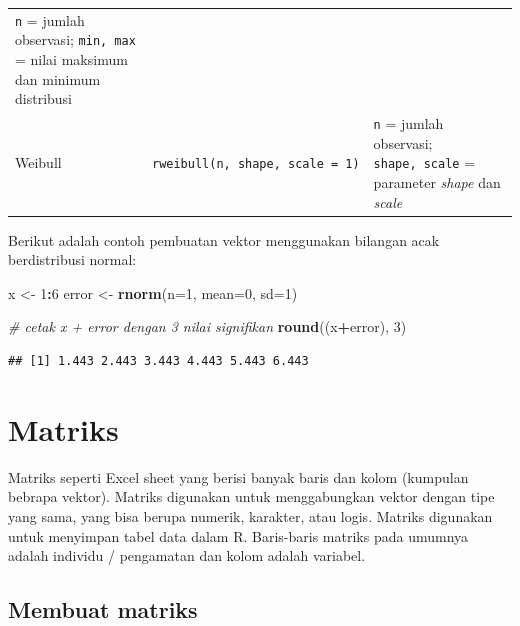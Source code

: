 \documentclass[]{book}
\newenvironment{Shaded}{\begin{snugshade}}{\end{snugshade}}
\newcommand{\CommentTok}[1]{\textcolor[rgb]{0.56,0.35,0.01}{\textit{#1}}}
\newcommand{\DataTypeTok}[1]{\textcolor[rgb]{0.13,0.29,0.53}{#1}}
\newcommand{\DecValTok}[1]{\textcolor[rgb]{0.00,0.00,0.81}{#1}}
\newcommand{\KeywordTok}[1]{\textcolor[rgb]{0.13,0.29,0.53}{\textbf{#1}}}
\newcommand{\NormalTok}[1]{#1}
\newcommand{\OperatorTok}[1]{\textcolor[rgb]{0.81,0.36,0.00}{\textbf{#1}}}
\newcommand{\StringTok}[1]{\textcolor[rgb]{0.31,0.60,0.02}{#1}}
\theoremstyle{definition}
\theoremstyle{definition}
\theoremstyle{definition}
\theoremstyle{remark}
\begin{document}
\begin{longtable}[]{@{}lll@{}}
\begin{minipage}[t]{0.65\columnwidth}
\texttt{n} = jumlah observasi; \texttt{min,\ max} = nilai maksimum dan minimum distribusi\strut
\end{minipage}\tabularnewline
\begin{minipage}[t]{0.07\columnwidth}\raggedright
Weibull\strut
\end{minipage} & \begin{minipage}[t]{0.19\columnwidth}\raggedright
\texttt{rweibull(n,\ shape,\ scale\ =\ 1)}\strut
\end{minipage} & \begin{minipage}[t]{0.65\columnwidth}\raggedright
\texttt{n} = jumlah observasi; \texttt{shape,\ scale} = parameter \emph{shape} dan \emph{scale}\strut
\end{minipage}\tabularnewline
\bottomrule
\end{longtable}

Berikut adalah contoh pembuatan vektor menggunakan bilangan acak berdistribusi normal:

\begin{Shaded}
\begin{Highlighting}[]
\NormalTok{x <-}\StringTok{ }\DecValTok{1}\OperatorTok{:}\DecValTok{6}
\NormalTok{error <-}\StringTok{ }\KeywordTok{rnorm}\NormalTok{(}\DataTypeTok{n=}\DecValTok{1}\NormalTok{, }\DataTypeTok{mean=}\DecValTok{0}\NormalTok{, }\DataTypeTok{sd=}\DecValTok{1}\NormalTok{)}

\CommentTok{# cetak x + error dengan 3 nilai signifikan}
\KeywordTok{round}\NormalTok{((x}\OperatorTok{+}\NormalTok{error), }\DecValTok{3}\NormalTok{)}
\end{Highlighting}
\end{Shaded}

\begin{verbatim}
## [1] 1.443 2.443 3.443 4.443 5.443 6.443
\end{verbatim}

\hypertarget{matriks}{%
\section{Matriks}\label{matriks}}

Matriks seperti Excel sheet yang berisi banyak baris dan kolom (kumpulan bebrapa vektor). Matriks digunakan untuk menggabungkan vektor dengan tipe yang sama, yang bisa berupa numerik, karakter, atau logis. Matriks digunakan untuk menyimpan tabel data dalam R. Baris-baris matriks pada umumnya adalah individu / pengamatan dan kolom adalah variabel.

\hypertarget{creatematrix}{%
\subsection{Membuat matriks}\label{creatematrix}}
\end{document}
